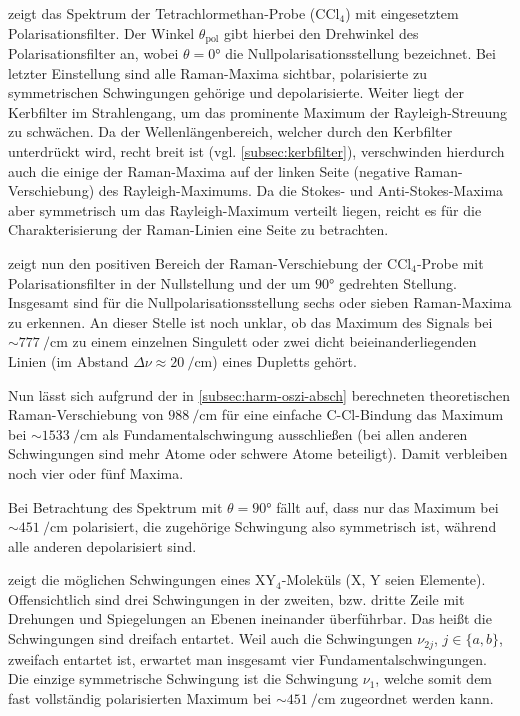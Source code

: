 \documentclass[../bericht.tex]{subfiles}
\begin{document}
         zeigt das Spektrum der Tetrachlormethan-Probe ($\mathrm{CCl_4}$) mit eingesetztem Polarisationsfilter. Der Winkel $\theta_\mathrm{pol}$ gibt hierbei den Drehwinkel des Polarisationsfilter an, wobei $\theta=\ang{0}$ die Nullpolarisationsstellung bezeichnet. Bei letzter Einstellung sind alle Raman-Maxima sichtbar, polarisierte zu symmetrischen Schwingungen gehörige und depolarisierte. Weiter liegt der Kerbfilter im Strahlengang, um das prominente Maximum der Rayleigh-Streuung zu schwächen. Da der Wellenlängenbereich, welcher durch den Kerbfilter unterdrückt wird, recht breit ist (vgl. \cref{subsec:kerbfilter}), verschwinden hierdurch auch die einige der Raman-Maxima auf der linken Seite (negative Raman-Verschiebung) des Rayleigh-Maximums. Da die Stokes- und Anti-Stokes-Maxima aber symmetrisch um das Rayleigh-Maximum verteilt liegen, reicht es für die Charakterisierung der Raman-Linien eine Seite zu betrachten.
        \medskip

         zeigt nun den positiven Bereich der Raman-Verschiebung der $\mathrm{CCl_4}$-Probe mit Polarisationsfilter in der Nullstellung und der um $\ang{90}$ gedrehten Stellung. Insgesamt sind für die Nullpolarisationsstellung sechs oder sieben Raman-Maxima zu erkennen. An dieser Stelle ist noch unklar, ob das Maximum des Signals bei $\sim \SI{777}{\per\centi\meter}$ zu einem einzelnen Singulett oder zwei dicht beieinanderliegenden Linien (im Abstand $\Delta \nu \approx \SI{20}{\per\centi\meter}$) eines Dupletts gehört.

        Nun lässt sich aufgrund der in \cref{subsec:harm-oszi-absch} berechneten theoretischen Raman-Verschiebung von $\SI{988}{\per\centi\meter}$ für eine einfache C-Cl-Bindung das Maximum bei $\sim \SI{1533}{\per\centi\meter}$ als Fundamentalschwingung ausschließen (bei allen anderen Schwingungen sind mehr Atome oder schwere Atome beteiligt). Damit verbleiben noch vier oder fünf Maxima.

        Bei Betrachtung des Spektrum mit $\theta=\ang{90}$ fällt auf, dass nur das Maximum bei $\sim\SI{451}{\per\centi\meter}$ polarisiert, die zugehörige Schwingung also symmetrisch ist, während alle anderen depolarisiert sind.

         zeigt die möglichen Schwingungen eines $\mathrm{XY_4}$-Moleküls (X, Y seien Elemente). Offensichtlich sind drei Schwingungen in der zweiten, bzw. dritte Zeile mit Drehungen und Spiegelungen an Ebenen ineinander überführbar. Das heißt die Schwingungen sind dreifach entartet. Weil auch die Schwingungen $\nu_{2j}$, $j\in\{a,b\}$, zweifach entartet ist, erwartet man insgesamt vier Fundamentalschwingungen. Die einzige symmetrische Schwingung ist die Schwingung $\nu_1$, welche somit dem fast vollständig polarisierten Maximum bei $\sim\SI{451}{\per\centi\meter}$ zugeordnet werden kann.
        \medskip
\end{document}

